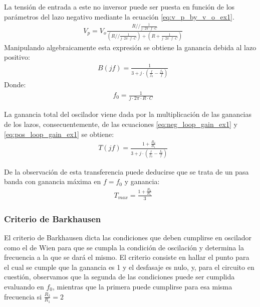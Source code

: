 La tensión de entrada a este no inversor puede ser puesta en función de los parámetros del lazo negativo mediante la ecuación \ref{eq:v_p_by_v_o_ex1}.
\begin{align*}
    & V_p = V_o \frac{R // \frac{1}{j \cdot 2\pi \cdot f \cdot C}}{\left( R // \frac{1}{j \cdot 2\pi \cdot f \cdot C} \right) + \left( R + \frac{1}{j \cdot 2\pi \cdot f \cdot C}\right)}
\end{align*}
Manipulando algebraicamente esta expresión se obtiene la ganancia debida al lazo positivo:
\begin{align}
    & B(jf) = \frac{1}{3 + j \cdot \left(\frac{f}{f_0} - \frac{f_0}{f}\right)}
    \label{eq:pos_loop_gain_ex1}
\end{align}
Donde:
\begin{align}
    & f_0 = \frac{1}{j \cdot 2\pi \cdot R \cdot C}
    \label{eq:osc_freq_ex1}
\end{align}

La ganancia total del oscilador viene dada por la multiplicación de las ganancias de los lazos, consecuentemente, de las ecuaciones \ref{eq:neg_loop_gain_ex1} y \ref{eq:pos_loop_gain_ex1}
se obtiene:
\begin{align}
    & T(jf) = \frac{1 + \frac{R_2}{R_1}}{3 + j \cdot \left(\frac{f}{f_0} - \frac{f_0}{f}\right)}
    \label{eq:total_gain_ex1}
\end{align}

De la observación de esta transferencia puede deducirse que se trata de un pasa banda con ganancia máxima en $f = f_0$ y ganancia:
\begin{align}
    & T_{max} = \frac{1 + \frac{R_2}{R_1}}{3}
    \label{eq:max_gain_ex1}
\end{align}


\subsubsection{Criterio de Barkhausen}
El criterio de Barkhausen dicta las condiciones que deben cumplirse en oscilador como el de Wien para que se cumpla la condición de oscilación y determina la frecuencia a 
la que se dará el mismo.
El criterio consiste en hallar el punto para el cual se cumple que la ganancia es 1 y el desfasaje es nulo, y, para el circuito en cuestión, observamos que la segunda de 
las condiciones puede ser cumplida evaluando en $f_0$, mientras que la primera puede cumplirse para esa misma frecuencia si $\frac{R_2}{R_1} = 2$


